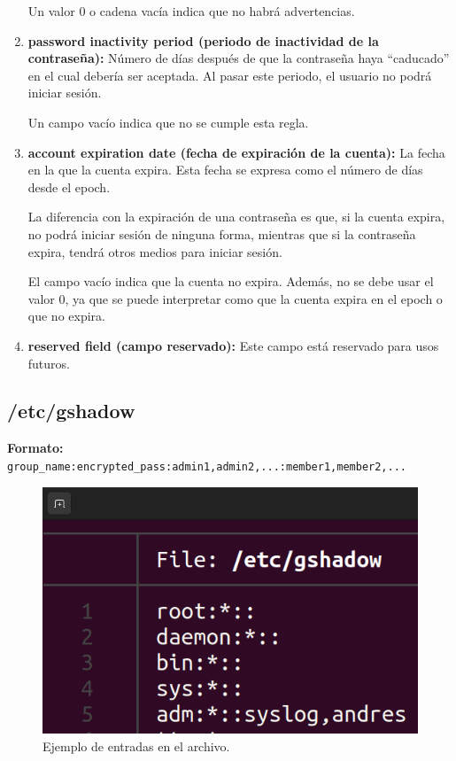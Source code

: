 \documentclass{article}
\begin{document}
\begin{enumerate}
    Un valor 0 o cadena vacía indica que no habrá advertencias.

    \item \textbf{password inactivity period (periodo de inactividad de la contraseña): }Número de días después de que la contraseña haya ``caducado'' en el cual debería ser aceptada. Al pasar este periodo, el usuario no podrá iniciar sesión.
    
    Un campo vacío indica que no se cumple esta regla.

    \item  \textbf{account expiration date (fecha de expiración de la cuenta): }La fecha en la que la cuenta expira. Esta fecha se expresa como el número de días desde el epoch.
    
    La diferencia con la expiración de una contraseña es que, si la cuenta expira, no podrá iniciar sesión de ninguna forma, mientras que si la contraseña expira, tendrá otros medios para iniciar sesión.

    El campo vacío indica que la cuenta no expira. Además, no se debe usar el valor 0, ya que se puede interpretar como que la cuenta expira en el epoch o que no expira.

    \item \textbf{reserved field (campo reservado): }Este campo está reservado para usos futuros.
\end{enumerate}


\subsection*{/etc/gshadow}
\textbf{Formato: }\verb|group_name:encrypted_pass:admin1,admin2,...:member1,member2,...|

\bigskip

\begin{figure}[H]
    \includegraphics[width=\textwidth]{imagenes/gshadowfile.png}
    \caption{Ejemplo de entradas en el archivo.}    
\end{figure}
\end{document}
